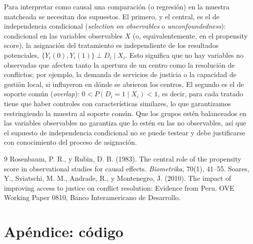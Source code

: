 \documentclass[11pt,a4paper]{article}
\begin{document}
Para interpretar como causal una comparación (o regresión) en la muestra matcheada se necesitan dos supuestos. El primero, y el central, es el de independencia condicional (\textit{selection on observables} o \textit{unconfoundedness}): condicional en las variables observables $X$ (o, equivalentemente, en el propensity score), la asignación del tratamiento es independiente de los resultados potenciales, $\{Y_i(0),Y_i(1)\}\perp D_i\mid X_i$. Esto significa que no hay variables no observadas que afecten tanto la apertura de un centro como la resolución de conflictos; por ejemplo, la demanda de servicios de justicia o la capacidad de gestión local, si influyeron en dónde se abrieron los centros. El segundo es el de soporte común (\textit{overlap}): $0<P(D_i=1\mid X_i)<1$, es decir, para cada tratado tiene que haber controles con características similares, lo que garantizamos restringiendo la muestra al soporte común. Que los grupos estén balanceados en las variables observables no garantiza que lo estén en las no observables, así que el supuesto de independencia condicional no se puede testear y debe justificarse con conocimiento del proceso de asignación.

\begin{thebibliography}{9}
 Rosenbaum, P. R., y Rubin, D. B. (1983). The central role of the propensity score in observational studies for causal effects. \textit{Biometrika}, 70(1), 41--55.
 Soares, Y., Sviatschi, M. M., Andrade, R., y Montenegro, J. (2010). The impact of improving access to justice on conflict resolution: Evidence from Peru. OVE Working Paper 0810, Banco Interamericano de Desarrollo.
\end{thebibliography}

\newpage
\appendix
\section*{Apéndice: código}

\end{document}
